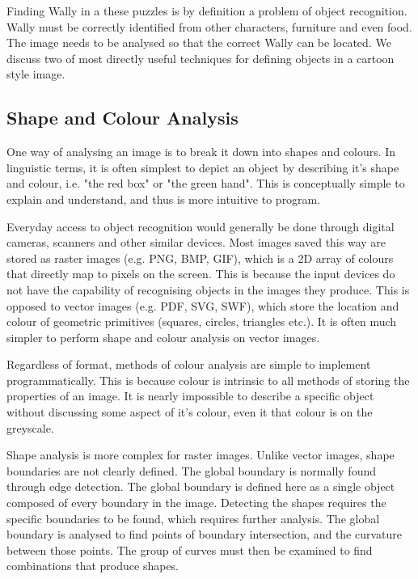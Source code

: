 \documentclass[../main.tex]{subfiles}
\begin{document}
    Finding Wally in a these puzzles is by definition a problem of object recognition.
    Wally must be correctly identified from other characters, furniture and even food.
    The image needs to be analysed so that the correct Wally can be located.
    We discuss two of most directly useful techniques for defining objects in a cartoon style image.
    \subsection{Shape and Colour Analysis}
      One way of analysing an image is to break it down into shapes and colours.
      In linguistic terms, it is often simplest to depict an object by describing it's shape and colour, i.e. "the red box" or "the green hand".
      This is conceptually simple to explain and understand, and thus is more intuitive to program.

      Everyday access to object recognition would generally be done through digital cameras, scanners and other similar devices.
      Most images saved this way are stored as raster images (e.g. PNG, BMP, GIF), which is a 2D array of colours that directly map to pixels on the screen.
      This is because the input devices do not have the capability of recognising objects in the images they produce.
      This is opposed to vector images (e.g. PDF, SVG, SWF), which store the location and colour of geometric primitives (squares, circles, triangles etc.).
      It is often much simpler to perform shape and colour analysis on vector images.

      Regardless of format, methods of colour analysis are simple to implement programmatically.
      This is because colour is intrinsic to all methods of storing the properties of an image.
      It is nearly impossible to describe a specific object without discussing some aspect of it's colour, even it that colour is on the greyscale.

      Shape analysis is more complex for raster images.
      Unlike vector images, shape boundaries are not clearly defined.
      The global boundary is normally found through edge detection.
      The global boundary is defined here as a single object composed of every boundary in the image.
      Detecting the shapes requires the specific boundaries to be found, which requires further analysis.
      The global boundary is analysed to find points of boundary intersection, and the curvature between those points.
      The group of curves must then be examined to find combinations that produce shapes.
\end{document}
